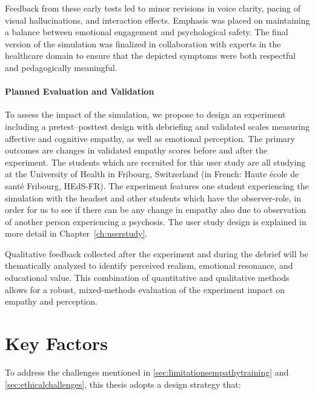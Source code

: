 \vspace{1em}

Feedback from these early tests led to minor revisions in voice clarity, pacing of visual hallucinations, and interaction effects. Emphasis was placed on maintaining a balance between emotional engagement and psychological safety. The final version of the simulation was finalized in collaboration with experts in the healthcare domain to ensure that the depicted symptoms were both respectful and pedagogically meaningful.

\paragraph{Planned Evaluation and Validation}

To assess the impact of the simulation, we propose to design an experiment including a pretest–posttest design with debriefing and validated scales measuring affective and cognitive empathy, as well as emotional perception. The primary outcomes are changes in validated empathy scores before and after the experiment. The students which are recruited for this user study are all studying at the University of Health in Fribourg, Switzerland (in French: Haute école de santé Fribourg, HEdS-FR). The experiment features one student experiencing the simulation with the headset and other students which have the observer-role, in order for us to see if there can be any change in empathy also due to observation of another person experiencing a psychosis. The user study design is explained in more detail in Chapter~\ref{ch:userstudy}.

Qualitative feedback collected after the experiment and during the debrief will be thematically analyzed to identify perceived realism, emotional resonance, and educational value. This combination of quantitative and qualitative methods allows for a robust, mixed-methods evaluation of the experiment impact on empathy and perception.


\section{Key Factors}
To address the challenges mentioned in \ref{sec:limitationsempathytraining} and \ref{sec:ethicalchallenges}, this thesis adopts a design strategy that:

